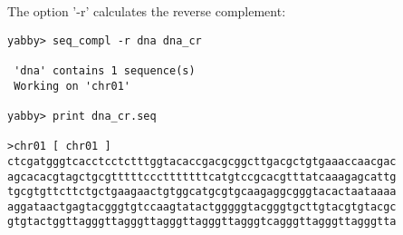 The option '-r' calculates the reverse complement: 

\begin{verbatim}
yabby> seq_compl -r dna dna_cr

 'dna' contains 1 sequence(s)
 Working on 'chr01'

yabby> print dna_cr.seq

>chr01 [ chr01 ]
ctcgatgggtcacctcctctttggtacaccgacgcggcttgacgctgtgaaaccaacgac
agcacacgtagctgcgtttttccctttttttcatgtccgcacgtttatcaaagagcattg
tgcgtgttcttctgctgaagaactgtggcatgcgtgcaagaggcgggtacactaataaaa
aggataactgagtacgggtgtccaagtatactgggggtacgggtgcttgtacgtgtacgc
gtgtactggttagggttagggttagggttagggttagggtcagggttagggttagggtta
\end{verbatim}

